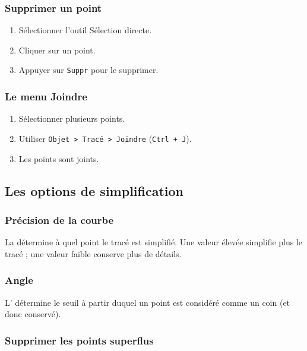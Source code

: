 \subsubsection{Supprimer un point}

\begin{enumerate}
    \item Sélectionner l'outil Sélection directe.
    \item Cliquer sur un point.
    \item Appuyer sur \texttt{Suppr} pour le supprimer.
\end{enumerate}

\subsubsection{Le menu Joindre}

\begin{enumerate}
    \item Sélectionner plusieurs points.
    \item Utiliser \texttt{Objet > Tracé > Joindre} (\texttt{Ctrl + J}).
    \item Les points sont joints.
\end{enumerate}

\subsection{Les options de simplification}

\subsubsection{Précision de la courbe}

La  détermine à quel point le tracé est simplifié. Une valeur élevée simplifie plus le tracé ; une valeur faible conserve plus de détails.

\subsubsection{Angle}

L' détermine le seuil à partir duquel un point est considéré comme un coin (et donc conservé).

\subsubsection{Supprimer les points superflus}

